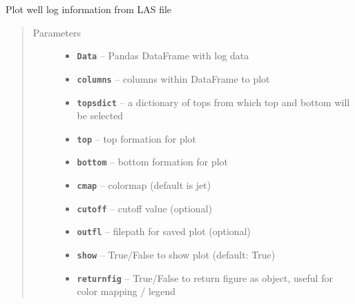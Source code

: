 \documentclass[letterpaper,10pt,english]{sphinxmanual}
\begin{document}
\begin{fulllineitems}
\label{index:pygeos.plot.log_plot}
Plot well log information from LAS file
\begin{quote}\begin{description}
\item[{Parameters}] \leavevmode\begin{itemize}
\item {} 
\textbf{\texttt{Data}} -- Pandas DataFrame with log data

\item {} 
\textbf{\texttt{columns}} -- columns within DataFrame to plot

\item {} 
\textbf{\texttt{topsdict}} -- a dictionary of tops from which top and bottom will be selected

\item {} 
\textbf{\texttt{top}} -- top formation for plot

\item {} 
\textbf{\texttt{bottom}} -- bottom formation for plot

\item {} 
\textbf{\texttt{cmap}} -- colormap (default is jet)

\item {} 
\textbf{\texttt{cutoff}} -- cutoff value (optional)

\item {} 
\textbf{\texttt{outfl}} -- filepath for saved plot (optional)

\item {} 
\textbf{\texttt{show}} -- True/False to show plot (default: True)

\item {} 
\textbf{\texttt{returnfig}} -- True/False to return figure as object, useful for color mapping / legend

\end{itemize}

\end{description}\end{quote}

\end{fulllineitems}
\end{document}
